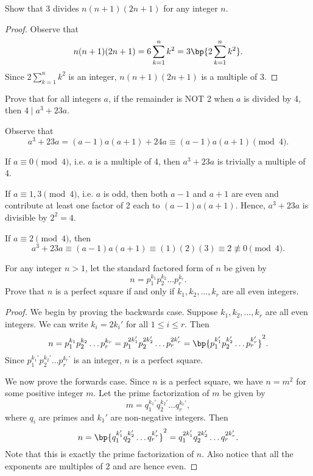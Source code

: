 \clearpage
\begin{problem}
    Show that 3 divides $n(n+1)(2n+1)$ for any integer $n$.
\end{problem}
\begin{proof}
    Observe that \[n(n+1)(2n+1) = 6 \sum_{k = 1}^n k^2 = 3\bp{2\sum_{k = 1}^n k^2}.\] Since $2\sum_{k = 1}^n k^2$ is an integer, $n(n+1)(2n+1)$ is a multiple of 3.
\end{proof}

\begin{problem}
    Prove that for all integers $a$, if the remainder is NOT 2 when $a$ is divided by 4, then $4 \mid a^3 + 23 a$.
\end{problem}
\begin{solution}
    Observe that \[a^3 + 23 a = (a-1)a(a+1) + 24a \equiv (a-1)a(a+1) \pmod{4}.\]

     If $a \equiv 0 \pmod{4}$, i.e. $a$ is a multiple of 4, then $a^3 + 23a$ is trivially a multiple of 4.

     If $a \equiv 1, 3 \pmod{4}$, i.e. $a$ is odd, then both $a-1$ and $a+1$ are even and contribute at least one factor of 2 each to $(a-1)a(a+1)$. Hence, $a^3 + 23a$ is divisible by $2^2 = 4$.
    
     If $a \equiv 2 \pmod{4}$, then \[a^3 + 23 a \equiv (a-1)a(a+1) \equiv (1)(2)(3) \equiv 2 \not\equiv 0 \pmod{4}.\]
\end{solution}

\begin{problem}
    For any integer $n > 1$, let the standard factored form of $n$ be given by \[n = p_1^{k_1} p_2^{k_2} \dots p_{r}^{k_r}.\] Prove that $n$ is a perfect square if and only if $k_1, k_2, \dots, k_r$ are all even integers.
\end{problem}
\begin{solution}
    \begin{proof}
        We begin by proving the backwards case. Suppose $k_1, k_2, \dots, k_r$ are all even integers. We can write $k_i = 2k_i'$ for all $1 \leq i \leq r$. Then \[n = p_1^{k_1} p_2^{k_2} \dots p_{r}^{k_r} = p_1^{2k_1'} p_2^{2k_2'} \dots p_{r}^{2k_r'} = \bp{p_1^{k_1'} p_2^{k_2'} \dots p_{r}^{k_r'}}^2.\] Since $p_1^{k_1'} p_2^{k_2'} \dots p_{r}^{k_r'}$ is an integer, $n$ is a perfect square.

        We now prove the forwards case. Since $n$ is a perfect square, we have $n = m^2$ for some positive integer $m$. Let the prime factorization of $m$ be given by \[m = q_1^{k_1'} q_2^{k_2'} \dots q_{r}^{k_r'},\] where $q_i$ are primes and $k_1'$ are non-negative integers. Then \[n = \bp{q_1^{k_1'} q_2^{k_2'} \dots q_{r}^{k_r'}}^2 = q_1^{2k_1'} q_2^{2k_2'} \dots q_{r}^{2k_r'}.\] Note that this is exactly the prime factorization of $n$. Also notice that all the exponents are multiples of 2 and are hence even.
    \end{proof}
\end{solution}

